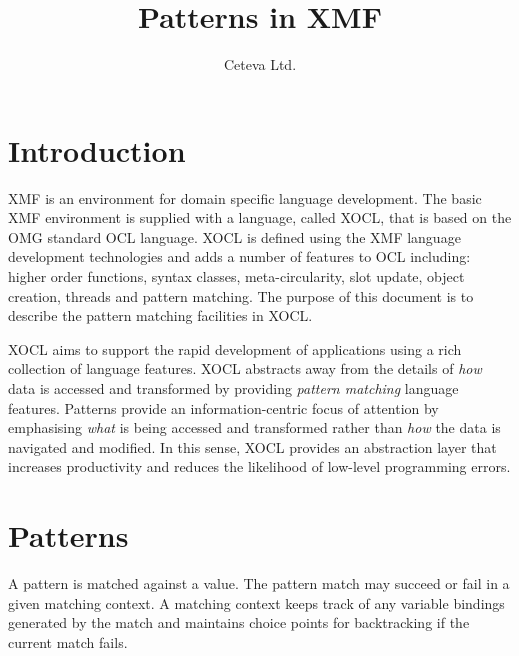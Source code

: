 \documentclass{article}
\title{Patterns in XMF}
\author{Ceteva Ltd.}
\begin{document}
\maketitle

\section{Introduction}

XMF is an environment for domain specific language development. The basic
XMF environment is supplied with a language, called XOCL, that is based on
the OMG standard OCL language. XOCL is defined using the XMF language
development technologies and adds a number of features to OCL including:
higher order functions, syntax classes, meta-circularity, slot update, 
object creation, threads and pattern matching. The purpose of this document
is to describe the pattern matching facilities in XOCL.

XOCL aims to support the rapid development of applications using a rich
collection of language features. XOCL abstracts away from the details of 
{\em how} data is accessed and transformed by providing {\em pattern matching}
language features. Patterns provide an information-centric focus of
attention by emphasising {\em what} is being accessed and transformed rather
than {\em how} the data is navigated and modified. In this sense, XOCL provides
an abstraction layer that increases productivity and reduces the likelihood
of low-level programming errors.

\section{Patterns}

A pattern is matched against a value. The pattern match may succeed or fail
in a given matching context. A matching context keeps track of any variable
bindings generated by the match and maintains choice points for backtracking
if the current match fails.
\end{document}
